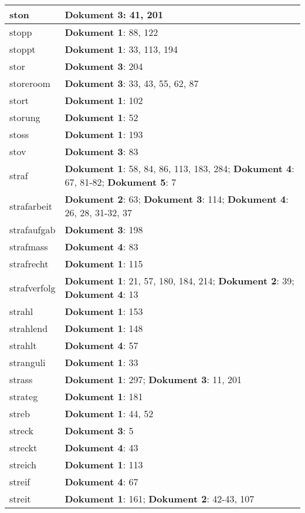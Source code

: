 \documentclass[a5paper]{article}
\begin{document}
\begin{longtable}[l]{|l|p{3in}|}
\hline
ston & \textbf{Dokument 3}: 41, 201 \\
\hline
stopp & \textbf{Dokument 1}: 88, 122 \\
\hline
stoppt & \textbf{Dokument 1}: 33, 113, 194 \\
\hline
stor & \textbf{Dokument 3}: 204 \\
\hline
storeroom & \textbf{Dokument 3}: 33, 43, 55, 62, 87 \\
\hline
stort & \textbf{Dokument 1}: 102 \\
\hline
storung & \textbf{Dokument 1}: 52 \\
\hline
stoss & \textbf{Dokument 1}: 193 \\
\hline
stov & \textbf{Dokument 3}: 83 \\
\hline
straf & \textbf{Dokument 1}: 58, 84, 86, 113, 183, 284; \textbf{Dokument 4}: 67, 81-82; \textbf{Dokument 5}: 7 \\
\hline
strafarbeit & \textbf{Dokument 2}: 63; \textbf{Dokument 3}: 114; \textbf{Dokument 4}: 26, 28, 31-32, 37 \\
\hline
strafaufgab & \textbf{Dokument 3}: 198 \\
\hline
strafmass & \textbf{Dokument 4}: 83 \\
\hline
strafrecht & \textbf{Dokument 1}: 115 \\
\hline
strafverfolg & \textbf{Dokument 1}: 21, 57, 180, 184, 214; \textbf{Dokument 2}: 39; \textbf{Dokument 4}: 13 \\
\hline
strahl & \textbf{Dokument 1}: 153 \\
\hline
strahlend & \textbf{Dokument 1}: 148 \\
\hline
strahlt & \textbf{Dokument 4}: 57 \\
\hline
stranguli & \textbf{Dokument 1}: 33 \\
\hline
strass & \textbf{Dokument 1}: 297; \textbf{Dokument 3}: 11, 201 \\
\hline
strateg & \textbf{Dokument 1}: 181 \\
\hline
streb & \textbf{Dokument 1}: 44, 52 \\
\hline
streck & \textbf{Dokument 3}: 5 \\
\hline
streckt & \textbf{Dokument 4}: 43 \\
\hline
streich & \textbf{Dokument 1}: 113 \\
\hline
streif & \textbf{Dokument 4}: 67 \\
\hline
streit & \textbf{Dokument 1}: 161; \textbf{Dokument 2}: 42-43, 107 \\
\hline

\end{longtable}
\end{document}
